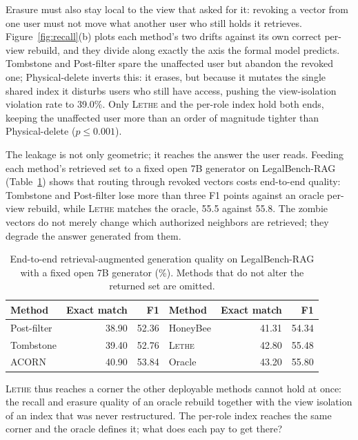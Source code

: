 \documentclass[sigconf, nonacm, review]{acmart}
\begin{document}
Erasure must also stay local to the view that asked for it: revoking a
vector from one user must not move what another user who still holds it
retrieves. Figure~\ref{fig:recall}(b) plots each method's two drifts
against its own correct per-view rebuild, and they divide along exactly the
axis the formal model predicts. Tombstone and Post-filter spare the
unaffected user but abandon the revoked one; Physical-delete inverts this:
it erases, but because it mutates the single shared index it disturbs users
who still have access, pushing the view-isolation violation rate to 39.0\%.
Only \textsc{Lethe} and the per-role index hold both ends, keeping the
unaffected user more than an order of magnitude tighter than Physical-delete ($p\le 0.001$).

The leakage is not only geometric; it reaches the answer the user reads.
Feeding each method's retrieved set to a fixed open 7B generator on
LegalBench-RAG (Table~\ref{tab:rag}) shows that routing through revoked
vectors costs end-to-end quality: Tombstone and Post-filter lose more
than three F1 points against an oracle per-view rebuild, while \textsc{Lethe}
matches the oracle, 55.5 against 55.8. The zombie vectors do not merely change
which authorized neighbors are retrieved; they degrade the answer generated
from them.

\begin{table}[t]
\centering
\small
\setlength{\tabcolsep}{6pt}
\caption{End-to-end retrieval-augmented generation quality on LegalBench-RAG
with a fixed open 7B generator (\%). Methods that do not alter the returned
set are omitted.}
\label{tab:rag}
\begin{tabular*}{\columnwidth}{@{\extracolsep{\fill}}lrrlrr@{}}
\toprule
Method & Exact match & F1 & Method & Exact match & F1 \\
\midrule
Post-filter & 38.90 & 52.36 & HoneyBee       & 41.31 & 54.34 \\
Tombstone   & 39.40 & 52.76 & \cellcolor{letherow}\textsc{Lethe} & \cellcolor{letherow}42.80 & \cellcolor{letherow}55.48 \\
ACORN       & 40.90 & 53.84 & Oracle         & 43.20 & 55.80 \\
\bottomrule
\end{tabular*}
\end{table}

\textsc{Lethe} thus reaches a corner the other deployable methods cannot
hold at once: the recall and erasure quality of an oracle rebuild together
with the view isolation of an index that was never restructured. The per-role
index reaches the same corner and the oracle defines it; what does each pay to
get there?
\end{document}
